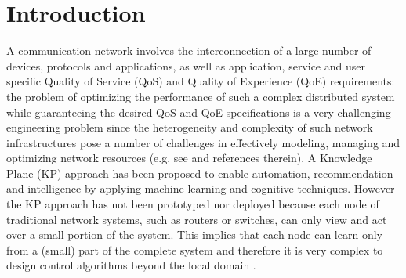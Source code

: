 \chapter*{\centering Introduction}  

A communication network involves the interconnection of a large number of devices, protocols and applications, as well as application, service and user specific Quality of Service (QoS) and Quality of Experience (QoE) requirements: the problem of optimizing the performance of such a complex distributed system while guaranteeing the desired QoS and QoE specifications is a very challenging engineering problem since the heterogeneity and complexity of such network infrastructures pose a number of challenges in effectively modeling, managing and optimizing network resources (e.g. see \cite{Neely2010,Lemeshko2019} and references therein). A Knowledge Plane (KP) approach \cite{Clark2003} has been proposed to enable automation, recommendation and intelligence by applying machine learning and cognitive techniques. However the KP approach has not been prototyped nor deployed because each node of traditional network systems, such as routers or switches, can only view and act over a small portion of the system. This implies that each node can learn only from a (small) part of the complete system and therefore it is very complex to design control algorithms beyond the local domain \cite{Mestres2017}.

